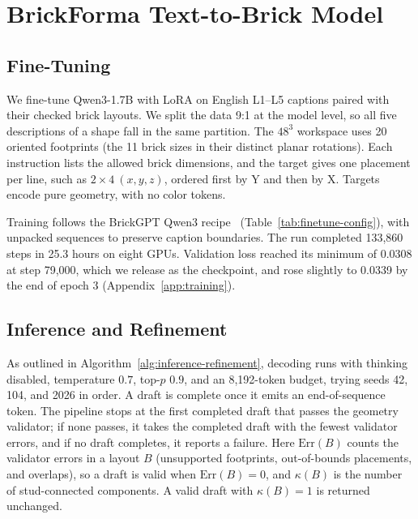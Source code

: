 \section{BrickForma Text-to-Brick Model}
\label{sec:model}
\subsection{Fine-Tuning}
\label{sec:training}
We fine-tune Qwen3-1.7B with LoRA on English L1--L5 captions paired with their checked brick layouts. We split the data 9:1 at the model level, so all five descriptions of a shape fall in the same partition. The $48^3$ workspace uses 20 oriented footprints (the 11 brick sizes in their distinct planar rotations). Each instruction lists the allowed brick dimensions, and the target gives one placement per line, such as $2{\times}4\ (x,y,z)$, ordered first by Y and then by X. Targets encode pure geometry, with no color tokens.

Training follows the BrickGPT Qwen3 recipe~\cite{brickgpt} (Table~\ref{tab:finetune-config}), with unpacked sequences to preserve caption boundaries. The run completed 133,860 steps in 25.3 hours on eight GPUs. Validation loss reached its minimum of 0.0308 at step 79,000, which we release as the checkpoint, and rose slightly to 0.0339 by the end of epoch 3 (Appendix~\ref{app:training}).


\subsection{Inference and Refinement}
As outlined in Algorithm~\ref{alg:inference-refinement}, decoding runs with thinking disabled, temperature $0.7$, top-$p$ $0.9$, and an 8,192-token budget, trying seeds 42, 104, and 2026 in order. A draft is complete once it emits an end-of-sequence token. The pipeline stops at the first completed draft that passes the geometry validator; if none passes, it takes the completed draft with the fewest validator errors, and if no draft completes, it reports a failure. Here $\mathrm{Err}(B)$ counts the validator errors in a layout $B$ (unsupported footprints, out-of-bounds placements, and overlaps), so a draft is valid when $\mathrm{Err}(B)=0$, and $\kappa(B)$ is the number of stud-connected components. A valid draft with $\kappa(B)=1$ is returned unchanged.

